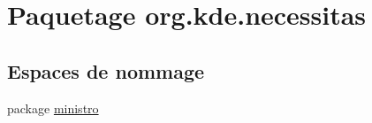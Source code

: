 \hypertarget{namespaceorg_1_1kde_1_1necessitas}{\section{Paquetage org.\-kde.\-necessitas}
\label{namespaceorg_1_1kde_1_1necessitas}
}
\subsection*{Espaces de nommage}
\begin{DoxyCompactItemize}
\item 
package \hyperlink{namespaceorg_1_1kde_1_1necessitas_1_1ministro}{ministro}
\end{DoxyCompactItemize}
